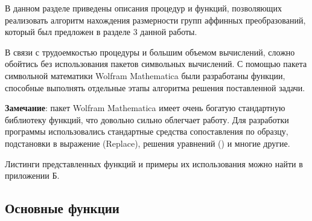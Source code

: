 \documentclass[../main.tex]{subfiles}
\begin{document}
В данном разделе приведены описания процедур и функций, позволяющих реализовать алгоритм нахождения размерности групп аффинных преобразований, который был предложен в разделе 3 данной работы.

В связи с трудоемкостью процедуры и большим объемом вычислений, сложно обойтись без использования пакетов символьных вычислений. С помощью пакета символьной математики {\ttfamily Wolfram Mathematica} были разработаны функции, способные выполнять отдельные этапы алгоритма решения поставленной задачи.

\textbf{Замечание}: пакет {\ttfamily Wolfram Mathematica} имеет очень богатую {стандартную} библиотеку функций, что довольно сильно облегчает работу. Для разработки программы использовались стандартные средства сопоставления по образцу, подстановки в выражение ({\ttfamily Replace}), решения уравнений ({}) и многие другие.

Листинги представленных функций и примеры их использования можно найти в приложении Б.

\subsection{Основные функции}
\end{document}
